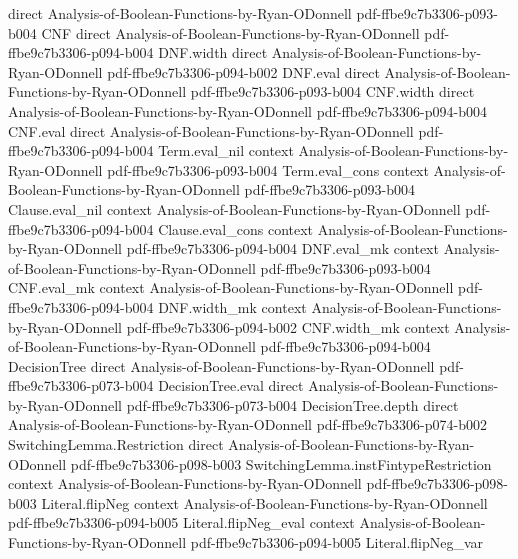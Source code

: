 \begin{lemma}
  {direct}
  {Analysis-of-Boolean-Functions-by-Ryan-ODonnell}
  {pdf-ffbe9c7b3306-p093-b004}
\proofstep
  {CNF}
  {direct}
  {Analysis-of-Boolean-Functions-by-Ryan-ODonnell}
  {pdf-ffbe9c7b3306-p094-b004}
\proofstep
  {DNF.width}
  {direct}
  {Analysis-of-Boolean-Functions-by-Ryan-ODonnell}
  {pdf-ffbe9c7b3306-p094-b002}
\proofstep
  {DNF.eval}
  {direct}
  {Analysis-of-Boolean-Functions-by-Ryan-ODonnell}
  {pdf-ffbe9c7b3306-p093-b004}
\proofstep
  {CNF.width}
  {direct}
  {Analysis-of-Boolean-Functions-by-Ryan-ODonnell}
  {pdf-ffbe9c7b3306-p094-b004}
\proofstep
  {CNF.eval}
  {direct}
  {Analysis-of-Boolean-Functions-by-Ryan-ODonnell}
  {pdf-ffbe9c7b3306-p094-b004}
\proofstep
  {Term.eval_nil}
  {context}
  {Analysis-of-Boolean-Functions-by-Ryan-ODonnell}
  {pdf-ffbe9c7b3306-p093-b004}
\proofstep
  {Term.eval_cons}
  {context}
  {Analysis-of-Boolean-Functions-by-Ryan-ODonnell}
  {pdf-ffbe9c7b3306-p093-b004}
\proofstep
  {Clause.eval_nil}
  {context}
  {Analysis-of-Boolean-Functions-by-Ryan-ODonnell}
  {pdf-ffbe9c7b3306-p094-b004}
\proofstep
  {Clause.eval_cons}
  {context}
  {Analysis-of-Boolean-Functions-by-Ryan-ODonnell}
  {pdf-ffbe9c7b3306-p094-b004}
\proofstep
  {DNF.eval_mk}
  {context}
  {Analysis-of-Boolean-Functions-by-Ryan-ODonnell}
  {pdf-ffbe9c7b3306-p093-b004}
\proofstep
  {CNF.eval_mk}
  {context}
  {Analysis-of-Boolean-Functions-by-Ryan-ODonnell}
  {pdf-ffbe9c7b3306-p094-b004}
\proofstep
  {DNF.width_mk}
  {context}
  {Analysis-of-Boolean-Functions-by-Ryan-ODonnell}
  {pdf-ffbe9c7b3306-p094-b002}
\proofstep
  {CNF.width_mk}
  {context}
  {Analysis-of-Boolean-Functions-by-Ryan-ODonnell}
  {pdf-ffbe9c7b3306-p094-b004}
\proofstep
  {DecisionTree}
  {direct}
  {Analysis-of-Boolean-Functions-by-Ryan-ODonnell}
  {pdf-ffbe9c7b3306-p073-b004}
\proofstep
  {DecisionTree.eval}
  {direct}
  {Analysis-of-Boolean-Functions-by-Ryan-ODonnell}
  {pdf-ffbe9c7b3306-p073-b004}
\proofstep
  {DecisionTree.depth}
  {direct}
  {Analysis-of-Boolean-Functions-by-Ryan-ODonnell}
  {pdf-ffbe9c7b3306-p074-b002}
\proofstep
  {SwitchingLemma.Restriction}
  {direct}
  {Analysis-of-Boolean-Functions-by-Ryan-ODonnell}
  {pdf-ffbe9c7b3306-p098-b003}
\proofstep
  {SwitchingLemma.instFintypeRestriction}
  {context}
  {Analysis-of-Boolean-Functions-by-Ryan-ODonnell}
  {pdf-ffbe9c7b3306-p098-b003}
\proofstep
  {Literal.flipNeg}
  {context}
  {Analysis-of-Boolean-Functions-by-Ryan-ODonnell}
  {pdf-ffbe9c7b3306-p094-b005}
\proofstep
  {Literal.flipNeg_eval}
  {context}
  {Analysis-of-Boolean-Functions-by-Ryan-ODonnell}
  {pdf-ffbe9c7b3306-p094-b005}
\proofstep
  {Literal.flipNeg_var}

\end{lemma}
